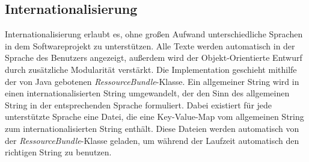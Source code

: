 \documentclass[parskip=full]{scrartcl}
\begin{document}
 \subsection{Internationalisierung}
 	Internationalisierung erlaubt es, ohne großen Aufwand unterschiedliche Sprachen in dem Softwareprojekt zu unterstützen. Alle Texte werden automatisch in der Sprache des Benutzers angezeigt, außerdem wird der Objekt-Orientierte Entwurf durch zusätzliche Modularität verstärkt. Die Implementation geschieht mithilfe der von Java gebotenen \textit{RessourceBundle}-Klasse. Ein allgemeiner String wird in einen internationalisierten String umgewandelt, der den Sinn des allgemeinen String in der entsprechenden Sprache formuliert. Dabei existiert für jede unterstützte Sprache eine Datei, die eine Key-Value-Map vom allgemeinen String zum internationalisierten String enthält. Diese Dateien werden automatisch von der \textit{RessourceBundle}-Klasse geladen, um während der Laufzeit automatisch den richtigen String zu benutzen.
  
\end{document}
